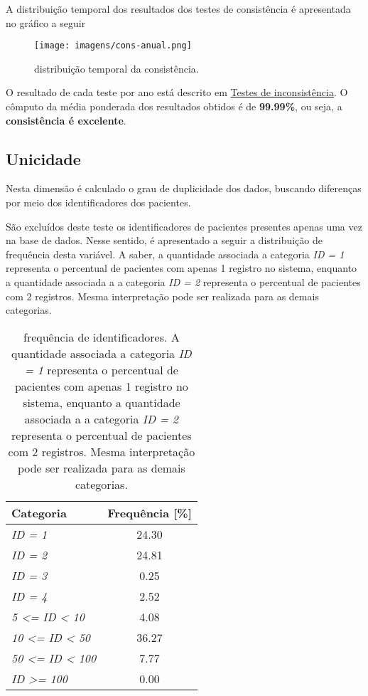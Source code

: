 \documentclass[
  12,
  table]{proadi}
\begin{document}
A distribuição temporal dos resultados dos testes de consistência é
apresentada no gráfico a seguir

\begin{figure}
\centering
\texttt{[image: imagens/cons-anual.png]}
\caption{distribuição temporal da consistência.}
\end{figure}

O resultado de cada teste por ano está descrito em
\protect\hyperlink{testes-de-inconsistuxeancia}{Testes de
inconsistência}. O cômputo da média ponderada dos resultados obtidos é
de \textbf{99.99\%}, ou seja, a \textbf{consistência é excelente}.

\hypertarget{unicidade}{%
\subsection{Unicidade}\label{unicidade}}

\label{sub:unicidade}

Nesta dimensão é calculado o grau de duplicidade dos dados, buscando
diferenças por meio dos identificadores dos pacientes.

São excluídos deste teste os identificadores de pacientes presentes
apenas uma vez na base de dados. Nesse sentido, é apresentado a seguir a
distribuição de frequência desta variável. A saber, a quantidade
associada a categoria \emph{ID = 1} representa o percentual de pacientes
com apenas 1 registro no sistema, enquanto a quantidade associada a a
categoria \emph{ID = 2} representa o percentual de pacientes com 2
registros. Mesma interpretação pode ser realizada para as demais
categorias.

\begin{table}[H]

\caption{\label{tab:unnamed-chunk-18}frequência de identificadores. A quantidade associada a categoria \textit{ID = 1} representa o percentual de pacientes com apenas 1 registro no sistema, enquanto a quantidade associada a a categoria \textit{ID = 2} representa o percentual de pacientes com 2 registros. Mesma interpretação pode ser realizada para as demais categorias.}
\centering
\fontsize{10}{12}\selectfont
\begin{tabular}[t]{>{}lc}
\toprule
Categoria & Frequência [\%]\\
\midrule
\em{ID = 1} & 24.30\\
\em{ID = 2} & 24.81\\
\em{ID = 3} & 0.25\\
\em{ID = 4} & 2.52\\
\em{5 <= ID < 10} & 4.08\\
\addlinespace
\em{10 <= ID < 50} & 36.27\\
\em{50 <= ID < 100} & 7.77\\
\em{ID >= 100} & 0.00\\
\bottomrule
\end{tabular}
\end{table}
\end{document}
